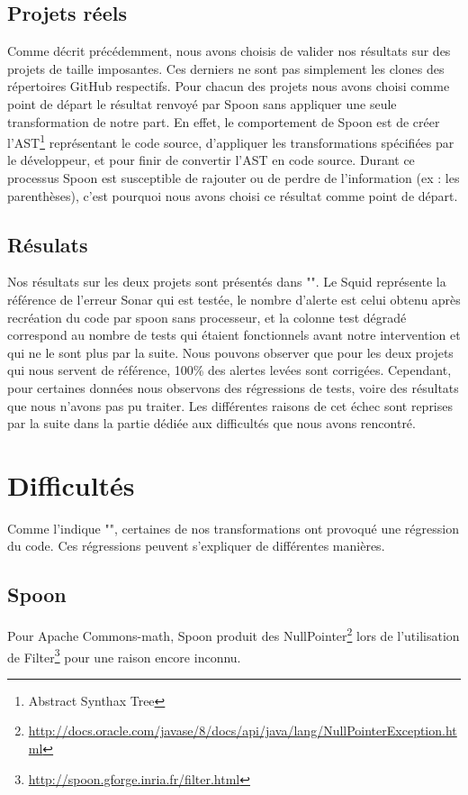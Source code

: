 \documentclass[a4paper]{article}
\begin{document}
\subsection{Projets réels}
\par Comme décrit précédemment, nous avons choisis de valider nos résultats sur des projets de taille imposantes. Ces derniers ne sont pas simplement les clones des répertoires GitHub respectifs. Pour chacun des projets nous avons choisi comme point de départ le résultat renvoyé par Spoon sans appliquer une seule transformation de notre part. En effet, le comportement de Spoon est de créer l'AST\footnote{Abstract Synthax Tree} représentant le code source, d'appliquer les transformations spécifiées par le développeur, et pour finir de convertir l'AST en code source. Durant ce processus Spoon est susceptible de rajouter ou de perdre de l'information (ex : les parenthèses), c'est pourquoi nous avons choisi ce résultat comme point de départ.
\subsection{Résulats}
\par Nos résultats sur les deux projets sont présentés dans "". Le Squid représente la référence de l'erreur Sonar qui est testée, le nombre d'alerte est celui obtenu après recréation du code par spoon sans processeur, et la colonne test dégradé correspond au nombre de tests qui étaient fonctionnels avant notre intervention et qui ne le sont plus par la suite. Nous pouvons observer que pour les deux projets qui nous servent de référence, 100\% des alertes levées sont corrigées. Cependant, pour certaines données nous observons des régressions de tests, voire des résultats que nous n'avons pas pu traiter. Les différentes raisons de cet échec sont reprises par la suite dans la partie dédiée aux difficultés que nous avons rencontré.

\section{Difficultés}
\par Comme l'indique "", certaines de nos transformations ont provoqué une régression du code. Ces régressions peuvent s'expliquer de différentes manières.

\subsection{Spoon}
\par Pour Apache Commons-math, Spoon produit des NullPointer\footnote{\url{http://docs.oracle.com/javase/8/docs/api/java/lang/NullPointerException.html}} lors de l'utilisation de Filter\footnote{\url{http://spoon.gforge.inria.fr/filter.html}} pour une raison encore inconnu.
\end{document}
